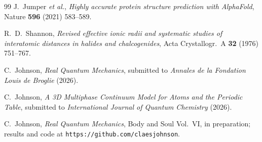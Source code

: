 \documentclass[11pt]{article}
\begin{document}
\begin{thebibliography}{99}
 J.~Jumper \emph{et al.}, \emph{Highly accurate protein structure prediction
  with AlphaFold}, Nature \textbf{596} (2021) 583--589.

 R.~D.~Shannon, \emph{Revised effective ionic radii and systematic
studies of interatomic distances in halides and chalcogenides}, Acta Crystallogr.\ A
\textbf{32} (1976) 751--767.

 C.~Johnson, \emph{Real Quantum Mechanics}, submitted to
  \emph{Annales de la Fondation Louis de Broglie} (2026).

 C.~Johnson, \emph{A 3D Multiphase Continuum Model for Atoms and the
  Periodic Table}, submitted to \emph{International Journal of Quantum Chemistry} (2026).

 C.~Johnson, \emph{Real Quantum Mechanics}, Body and Soul Vol.~VI,
  in preparation; results and code at \texttt{https://github.com/claesjohnson}.

\end{thebibliography}
\end{document}
